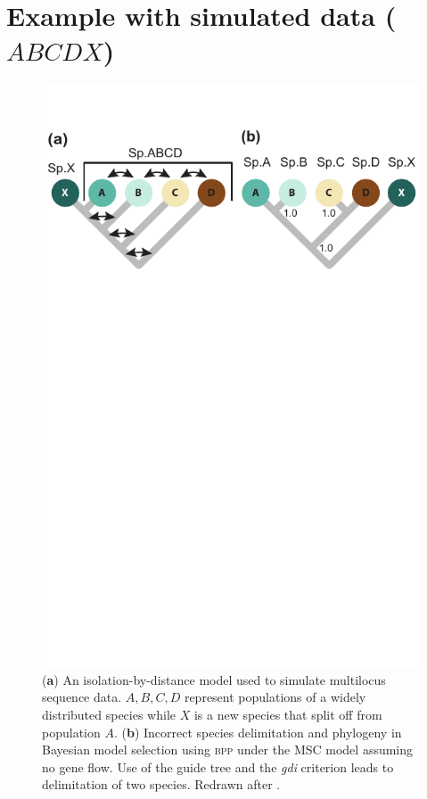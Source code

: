 \documentclass[A4]{article1}
\begin{document}
\section{Example with simulated data ($ABCDX$)}

\begin{figure}[h]
   \centering
   \includegraphics[scale=0.7]{figs/fig-ABCDX}
   
   \caption{(\textbf{a}) An isolation-by-distance model used to simulate multilocus
    sequence data.  $A, B, C, D$ represent populations of a widely distributed species
    while $X$ is a new species that split off from population $A$.  (\textbf{b}) Incorrect
    species delimitation and phylogeny in Bayesian model selection using \textsc{bpp} under
    the MSC model assuming no gene flow.  Use of the guide tree and the \textit{gdi}
    criterion leads to delimitation of two species.  Redrawn after
    \citet[][fig.~5]{Leache2019}. %
} \label{fig:ABCDX}
\end{figure}
\end{document}
